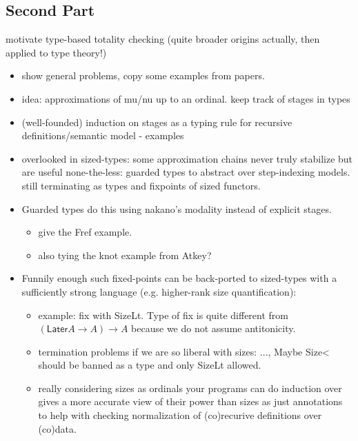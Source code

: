 \documentclass{book}
\begin{document}


\subsection{Second Part}

motivate type-based totality checking (quite broader origins actually, then applied to type theory!)

  \begin{itemize}
  \item show general problems, copy some examples from papers.
  \item idea: approximations of mu/nu up to an ordinal. keep track of stages in types
  \item (well-founded) induction on stages as a typing rule for recursive definitions/semantic model
    - examples 
  \item overlooked in sized-types: some approximation chains never truly
  stabilize but are useful none-the-less: guarded types to abstract
  over step-indexing models. still terminating as types and fixpoints of sized functors.
  \item Guarded types do this using nakano's modality instead of explicit stages.
    \begin{itemize}
    \item give the Fref example.
    \item also tying the knot example from Atkey?
    \end{itemize}
    
  \item Funnily enough such fixed-points can be back-ported to
    sized-types with a sufficiently strong language (e.g. higher-rank
    size quantification):
    \begin{itemize}
    \item example: fix with SizeLt. Type of fix is quite different from
    $(\mathsf{Later} A \to  A) \to A$ because we do not assume antitonicity.

    \item termination problems if we are so liberal with sizes: ..., Maybe Size< should be banned as a type and only SizeLt allowed.
    \item really considering sizes as ordinals your programs can do
         induction over gives a more accurate view of their power than sizes as just
         annotations to help with checking normalization of (co)recurive definitions over (co)data.
    \end{itemize}
    \end{itemize}
\end{document}
